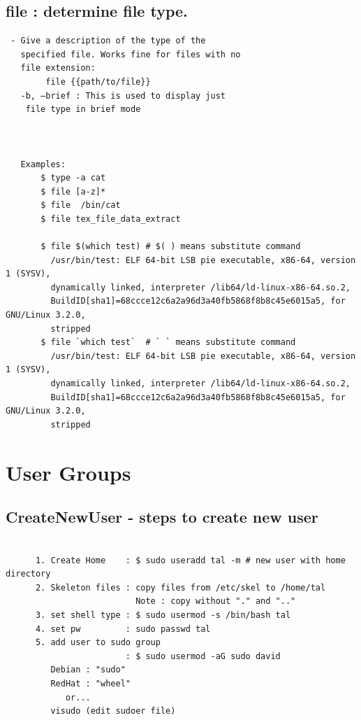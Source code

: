 \documentclass[a4paper,12pt]{article}
\begin{document}
\subsection{file    : determine file type.}
\begin{verbatim}
 - Give a description of the type of the 
   specified file. Works fine for files with no
   file extension:  
        file {{path/to/file}}
   -b, –brief : This is used to display just
    file type in brief mode
        
   
        
   Examples:
       $ type -a cat       
       $ file [a-z]*
       $ file  /bin/cat 
       $ file tex_file_data_extract       
        
       $ file $(which test) # $( ) means substitute command
         /usr/bin/test: ELF 64-bit LSB pie executable, x86-64, version 1 (SYSV), 
         dynamically linked, interpreter /lib64/ld-linux-x86-64.so.2, 
         BuildID[sha1]=68ccce12c6a2a96d3a40fb5868f8b8c45e6015a5, for GNU/Linux 3.2.0, 
         stripped
       $ file `which test`  # ` ` means substitute command
         /usr/bin/test: ELF 64-bit LSB pie executable, x86-64, version 1 (SYSV), 
         dynamically linked, interpreter /lib64/ld-linux-x86-64.so.2, 
         BuildID[sha1]=68ccce12c6a2a96d3a40fb5868f8b8c45e6015a5, for GNU/Linux 3.2.0, 
         stripped        
\end{verbatim}


\section{User Groups }

\subsection{CreateNewUser - steps to create new user  }
\begin{verbatim}
     
      1. Create Home    : $ sudo useradd tal -m # new user with home directory
      2. Skeleton files : copy files from /etc/skel to /home/tal 
                          Note : copy without "." and ".."
      3. set shell type : $ sudo usermod -s /bin/bash tal            
      4. set pw         : sudo passwd tal
      5. add user to sudo group
                        : $ sudo usermod -aG sudo david
         Debian : "sudo"         
         RedHat : "wheel"    
            or...
         visudo (edit sudoer file)   
\end{verbatim}
\end{document}
